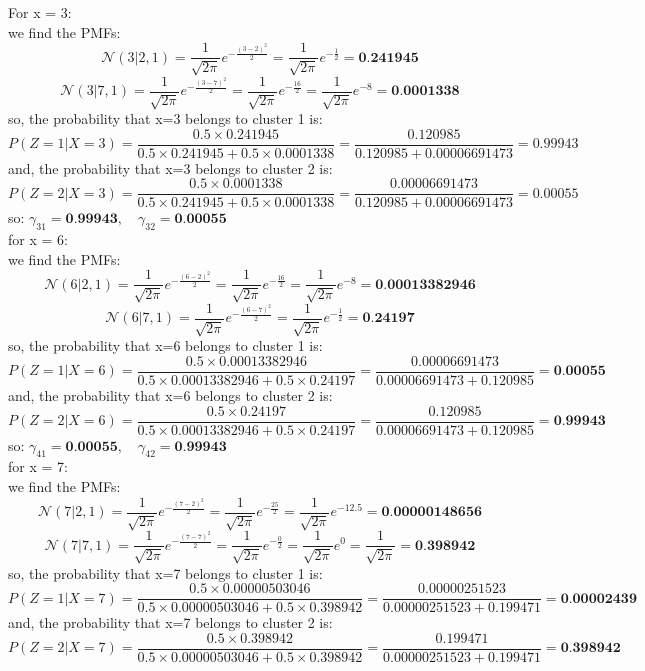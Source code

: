 \documentclass{article}
\begin{document}
\begin{enumerate}
For x = 3:
\\ we find the PMFs:
\[
\mathcal{N}(3 | 2, 1) = \frac{1}{\sqrt{2\pi}} e^{-\frac{(3-2)^2}{2}} = \frac{1}{\sqrt{2\pi}} e^{-\frac{1}{2}} = \textbf{0.241945}
\]
\[
\mathcal{N}(3 | 7, 1) = \frac{1}{\sqrt{2\pi}} e^{-\frac{(3-7)^2}{2}} = \frac{1}{\sqrt{2\pi}} e^{-\frac{16}{2}} = \frac{1}{\sqrt{2\pi}} e^{-8} = \textbf{0.0001338}
\]
so, the probability that x=3 belongs to cluster 1 is:
\[
P(Z = 1 | X = 3) = \frac{0.5 \times 0.241945}{0.5 \times 0.241945 + 0.5 \times 0.0001338} = \frac{0.120985}{0.120985 + 0.00006691473} = 0.99943
\]
and, the probability that x=3 belongs to cluster 2 is:
\[
P(Z = 2 | X = 3) = \frac{0.5 \times 0.0001338}{0.5 \times 0.241945 + 0.5 \times 0.0001338} = \frac{0.00006691473}{0.120985 + 0.00006691473} = 0.00055
\]
so: $\gamma_{31} = \textbf{0.99943}, \quad \gamma_{32} = \textbf{0.00055}$
\\ for x = 6:
\\ we find the PMFs:
\[
\mathcal{N}(6 | 2, 1) = \frac{1}{\sqrt{2\pi}} e^{-\frac{(6-2)^2}{2}} = \frac{1}{\sqrt{2\pi}} e^{-\frac{16}{2}} = \frac{1}{\sqrt{2\pi}} e^{-8} = \textbf{0.00013382946}
\]
\[
\mathcal{N}(6 | 7, 1) = \frac{1}{\sqrt{2\pi}} e^{-\frac{(6-7)^2}{2}} = \frac{1}{\sqrt{2\pi}} e^{-\frac{1}{2}} = \textbf{0.24197}
\]  
so, the probability that x=6 belongs to cluster 1 is:
\[
P(Z = 1 | X = 6) = \frac{0.5 \times 0.00013382946}{0.5 \times 0.00013382946 + 0.5 \times 0.24197} = \frac{0.00006691473}{0.00006691473 + 0.120985} = \textbf{0.00055}
\]
and, the probability that x=6 belongs to cluster 2 is:
\[
P(Z = 2 | X = 6) = \frac{0.5 \times 0.24197}{0.5 \times 0.00013382946 + 0.5 \times 0.24197} = \frac{0.120985}{0.00006691473 + 0.120985} = \textbf{0.99943}
\]
so: $\gamma_{41} = \textbf{0.00055}, \quad \gamma_{42} = \textbf{0.99943}$
\\ for x = 7:
\\ we find the PMFs:
\[
\mathcal{N}(7 | 2, 1) = \frac{1}{\sqrt{2\pi}} e^{-\frac{(7-2)^2}{2}} = \frac{1}{\sqrt{2\pi}} e^{-\frac{25}{2}} = \frac{1}{\sqrt{2\pi}} e^{-12.5} = \textbf{0.00000148656}
\]
\[
\mathcal{N}(7 | 7, 1) = \frac{1}{\sqrt{2\pi}} e^{-\frac{(7-7)^2}{2}} = \frac{1}{\sqrt{2\pi}} e^{-\frac{0}{2}} = \frac{1}{\sqrt{2\pi}} e^{0} = \frac{1}{\sqrt{2\pi}} = \textbf{0.398942}
\]
so, the probability that x=7 belongs to cluster 1 is:   
\[
P(Z = 1 | X = 7) = \frac{0.5 \times 0.00000503046}{0.5 \times 0.00000503046 + 0.5 \times 0.398942} = \frac{0.00000251523}{0.00000251523 + 0.199471} = \textbf{0.00002439}
\]
and, the probability that x=7 belongs to cluster 2 is:
\[
P(Z = 2 | X = 7) = \frac{0.5 \times 0.398942}{0.5 \times 0.00000503046 + 0.5 \times 0.398942} = \frac{0.199471}{0.00000251523 + 0.199471} = \textbf{0.398942}
\]
\end{enumerate}
\end{document}
